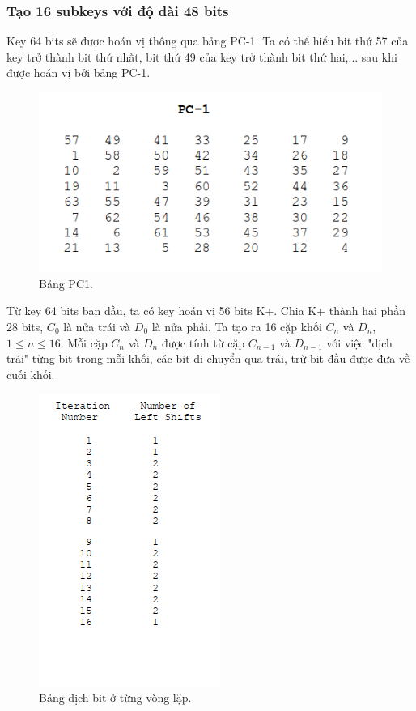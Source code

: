 \documentclass[a4paper]{article}
\begin{document}
\subsubsection{Tạo 16 subkeys với độ dài 48 bits}
Key 64 bits sẽ được hoán vị thông qua bảng PC-1. Ta có thể hiểu bit thứ 57 của key trở thành bit thứ nhất, bit thứ 49 của key trở thành bit thứ hai,... sau khi được hoán vị bởi bảng PC-1.
\begin{figure}[htp]
    \centering
    \includegraphics[scale=0.7]{PC1.png}
    \caption{Bảng PC1.}
    \label{fig:PC1}
\end{figure}
Từ key 64 bits ban đầu, ta có key hoán vị 56 bits K+. Chia K+ thành hai phần 28 bits, $C_0$ là nửa trái và $D_0$ là nửa phải. Ta tạo ra 16 cặp khối $C_n$ và $D_n$, $1 \leq n \leq 16$. Mỗi cặp $C_n$ và $D_n$ được tính từ cặp $C_{n-1}$ và $D_{n-1}$ với việc "dịch trái" từng bit trong mỗi khối, các bit di chuyển qua trái, trừ bit đầu được đưa về cuối khối.
\begin{figure}[htp]
    \centering
    \includegraphics{shift.png}
    \caption{Bảng dịch bit ở từng vòng lặp.}
    \label{fig:shift}
\end{figure}
\end{document}
